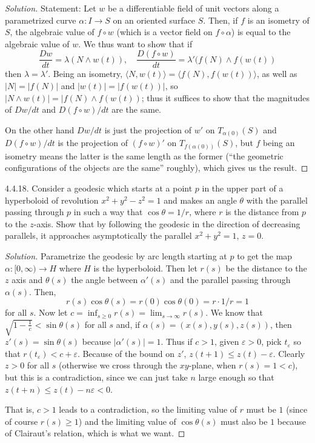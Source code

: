 \documentclass[10pt]{scrartcl}
\providecommand{\eps}{\varepsilon}
\newenvironment{soln}{\begin{proof}[Solution]}{\end{proof}}
\begin{document}
\begin{soln}
	Statement:
	Let $w$ be a differentiable field of unit vectors along a parametrized curve
	$\alpha\colon I\to S$ on an oriented surface $S$.
	Then, if $f$ is an isometry of $S$, the algebraic value of
	$f\circ w$ (which is a vector field on $f\circ\alpha$)
	is equal to the algebraic value of $w$.
	We thus want to show that if
	\[\frac{Dw}{dt} = \lambda(N\wedge w(t)),\quad
	\frac{D(f\circ w)}{dt} = \lambda'(f(N)\wedge f(w(t))\]
	then $\lambda = \lambda'$.
	Being an isometry, $\langle N,w(t)\rangle = \langle f(N),f(w(t))\rangle$,
	as well as $|N| = |f(N)|$ and $|w(t)| = |f(w(t))|$, so
	$|N\wedge w(t)| = |f(N)\wedge f(w(t))$; thus it suffices to show that
	the magnitudes of $Dw/dt$ and $D(f\circ w)/dt$ are the same.
	
	On the other hand $Dw/dt$ is just the projection of $w'$
	on $T_{\alpha(0)}(S)$ and $D(f\circ w)/dt$ is the projection of
	$(f\circ w)'$ on $T_{f(\alpha(0))}(S)$,
	but $f$ being an isometry means the latter is the same length as the former
	(``the geometric configurations of the objects are the same'' roughly),
	which gives us the result.
\end{soln}

\begin{problem*}4.4.18.
	Consider a geodesic which starts at a point $p$ in the upper part
	of a hyperboloid of revolution $x^2+y^2-z^2=1$
	and makes an angle $\theta$ with the parallel passing through $p$
	in such a way that $\cos\theta = 1/r$, where $r$ is
	the distance from $p$ to the $z$-axis.
	Show that by following the geodesic in the direction of
	decreasing parallels, it approaches asymptotically
	the parallel $x^2+y^2=1$, $z=0$.
\end{problem*}

\begin{soln}
	Parametrize the geodesic by arc length starting at $p$
	to get the map $\alpha\colon[0,\infty)\to H$ where $H$ is the hyperboloid.
	Then let $r(s)$ be the distance to the $z$ axis
	and $\theta(s)$ the angle between $\alpha'(s)$ and
	the parallel passing through $\alpha(s)$. Then,
	\[r(s)\cos \theta(s) = r(0)\cos\theta(0) = r\cdot1/r = 1\]
	for all $s$.
	Now let $c = \inf_{s\ge 0}r(s) = \lim_{s\to\infty} r(s)$.
	We know that $\sqrt{1-\frac1c} < \sin\theta(s)$ for all $s$
	and, if $\alpha(s) = (x(s),y(s),z(s))$, then $z'(s) = \sin\theta(s)$
	because $|\alpha'(s)| = 1$.
	Thus if $c > 1$, given $\eps > 0$, pick $t_\eps$ so that
	$r(t_\eps) < c+\eps$. Because of the bound on $z'$,
	$z(t+1) \le z(t)-\eps$. Clearly $z > 0$ for all $s$
	(otherwise we cross through the $xy$-plane, when $r(s)=1<c$),
	but this is a contradiction, since we can just take $n$ large enough
	so that $z(t+n) \le z(t) - n\eps < 0$.
	
	That is, $c>1$ leads to a contradiction,
	so the limiting value of $r$ must be $1$ (since of course $r(s)\ge1$)
	and the limiting value of $\cos\theta(s)$ must also be $1$
	because of Clairaut's relation, which is what we want.
\end{soln}
\end{document}
